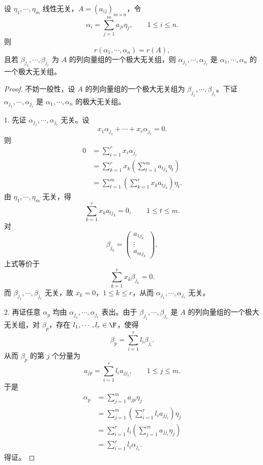 \begin{proposition}
	设 $\eta_1,\cdots,\eta_m$ 线性无关，$A=(a_{ij})_{m\times n}$，令
	\[
	\alpha_i=\sum_{j=1}^m a_{ji}\eta_j,
	\qquad 1\leq i\leq n.
	\]
	则
	\[
	r(\alpha_1,\cdots,\alpha_n)=r(A),
	\]
	且若 $\beta_{j_1},\cdots,\beta_{j_r}$ 为 $A$ 的列向量组的一个极大无关组，则
	$\alpha_{j_1},\cdots,\alpha_{j_r}$ 是 $\alpha_1,\cdots,\alpha_n$ 的一个极大无关组。
\end{proposition}
\begin{proof}
	不妨一般性，设 $A$ 的列向量组的一个极大无关组为
	$\beta_{j_1},\cdots,\beta_{j_r}$。下证
	$\alpha_{j_1},\cdots,\alpha_{j_r}$ 是 $\alpha_1,\cdots,\alpha_n$ 的极大无关组。
	
	$1.$ 先证 $\alpha_{j_1},\cdots,\alpha_{j_r}$ 无关。设
	\[
	x_1\alpha_{j_1}+\cdots+x_r\alpha_{j_r}=0.
	\]
	则
	\begin{align*}
	0
	&=\sum_{i=1}^r x_i\alpha_{j_i}\\
	&=\sum_{k=1}^r x_k\left(\sum_{t=1}^m a_{tj_k}\eta_t\right)\\
	&=\sum_{t=1}^m\left(\sum_{k=1}^r x_k a_{tj_k}\right)\eta_t.
	\end{align*}
	由 $\eta_1,\cdots,\eta_m$ 无关，得
	\[
	\sum_{k=1}^r x_k a_{tj_k}=0,
	\qquad 1\leq t\leq m.
	\]
	对
	\[
	\beta_{j_k}=
	\begin{pmatrix}
		a_{1j_k}\\
		\vdots\\
		a_{mj_k}
	\end{pmatrix},
	\]
	上式等价于
	\[
	\sum_{k=1}^r x_k\beta_{j_k}=0.
	\]
	而 $\beta_{j_1},\cdots,\beta_{j_r}$ 无关，故 $x_k=0$，$1\leq k\leq r$，从而
	$\alpha_{j_1},\cdots,\alpha_{j_r}$ 无关。
	
	$2.$ 再证任意 $\alpha_p$ 均由 $\alpha_{j_1},\cdots,\alpha_{j_r}$ 表出。由于
	$\beta_{j_1},\cdots,\beta_{j_r}$ 是 $A$ 的列向量组的一个极大无关组，对 $\beta_p$，存在 $l_1,\cdots,l_r\in\F$，使得
	\[
	\beta_p=\sum_{i=1}^r l_i\beta_{j_i}.
	\]
	从而 $\beta_p$ 的第 $j$ 个分量为
	\[
	a_{jp}=\sum_{i=1}^r l_i a_{j j_i},
	\qquad 1\leq j\leq m.
	\]
	于是
	\begin{align*}
	\alpha_p
	&=\sum_{j=1}^m a_{jp}\eta_j\\
	&=\sum_{j=1}^m\left(\sum_{i=1}^r l_i a_{j j_i}\right)\eta_j\\
	&=\sum_{i=1}^r l_i\left(\sum_{j=1}^m a_{j j_i}\eta_j\right)\\
	&=\sum_{i=1}^r l_i\alpha_{j_i}.
	\end{align*}
	得证。
\end{proof}


